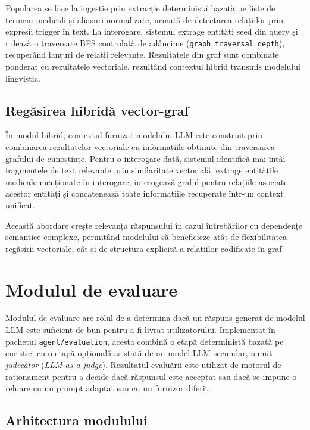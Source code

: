 \documentclass[12pt, a4paper, oneside, romanian]{teza-upb}
\begin{document}
Popularea se face la ingestie prin extracție deterministă bazată pe liste de termeni medicali și aliasuri normalizate, urmată de detectarea relațiilor prin expresii trigger în text. La interogare, sistemul extrage entități seed din query și rulează o traversare BFS controlată de adâncime (\texttt{graph\_traversal\_depth}), recuperând lanțuri de relații relevante. Rezultatele din graf sunt combinate ponderat cu rezultatele vectoriale, rezultând contextul hibrid transmis modelului lingvistic.

\subsection{Regăsirea hibridă vector-graf}

În modul hibrid, contextul furnizat modelului LLM este construit prin combinarea rezultatelor vectoriale cu informațiile obținute din traversarea grafului de cunoștințe. Pentru o interogare dată, sistemul identifică mai întâi fragmentele de text relevante prin similaritate vectorială, extrage entitățile medicale menționate în interogare, interogează graful pentru relațiile asociate acestor entități și concatenează toate informațiile recuperate într-un context unificat.

Această abordare crește relevanța răspunsului în cazul întrebărilor cu dependențe semantice complexe, permițând modelului să beneficieze atât de flexibilitatea regăsirii vectoriale, cât și de structura explicită a relațiilor codificate în graf.

\section{Modulul de evaluare}
\label{sec:evaluare}

Modulul de evaluare are rolul de a determina dacă un răspuns generat de modelul LLM este suficient de bun pentru a fi livrat utilizatorului. Implementat în pachetul \texttt{agent/evaluation}, acesta combină o etapă deterministă bazată pe euristici cu o etapă opțională asistată de un model LLM secundar, numit \textit{judecător} (\textit{LLM-as-a-judge}). Rezultatul evaluării este utilizat de motorul de raționament pentru a decide dacă răspunsul este acceptat sau dacă se impune o reluare cu un prompt adaptat sau cu un furnizor diferit.

\subsection{Arhitectura modulului}
\end{document}
